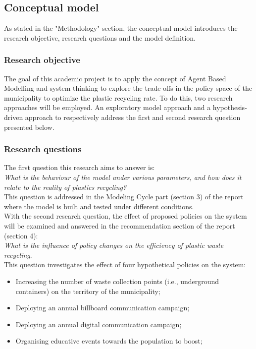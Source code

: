 \subsection{Conceptual model}
\Noindent As stated in the "Methodology" section, the conceptual model introduces the research objective, research questions and the model definition.
\subsubsection{Research objective}
\noindent The goal of this academic project is to apply the concept of Agent Based Modelling and system thinking to explore the trade-offs in the policy space of the municipality to optimize the plastic recycling rate. To do this, two research approaches will be employed. An exploratory model approach and a hypothesis-driven approach to respectively address the first and second research question presented below.

\subsubsection{Research questions}
\noindent The first question this research aims to answer is: \\ 
\textit{What is the behaviour of the model under various parameters, and how does it relate to the reality of plastics recycling?}\\
\noindent This question is addressed in the Modeling Cycle part (section 3) of the report where the model is built and tested under different conditions. \\
\noindent With the second research question, the effect of proposed policies on the system will be examined and answered in the recommendation section of the report (section 4):\\ 
\textit{What is the influence of policy changes on the efficiency of plastic waste recycling}.\\
\Noindent This question investigates the effect of four hypothetical policies on the system:
\begin{itemize}
  \item Increasing the number of waste collection points (i.e., underground containers) on the territory of the municipality;
  \item Deploying an annual billboard communication campaign;
  \item Deploying an annual digital communication campaign;
  \item Organising educative events towards the population to boost;
\end{itemize}

